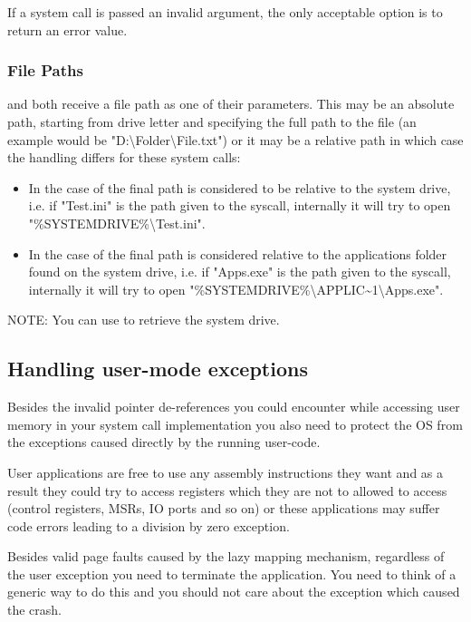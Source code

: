 If a system call is passed an invalid argument, the only acceptable option is to return an error
value.

\subsubsection{File Paths}

 and  both receive a file path as one of their
parameters. This may be an absolute path, starting from drive letter and specifying the full path
to the file (an example would be "D:\textbackslash Folder\textbackslash File.txt") or it may be a
relative path in which case the handling differs for these system calls:
\begin{itemize}
	\item In the case of  the final path is considered to be relative to the
system drive, i.e. if "Test.ini" is the path given to the syscall, internally it will try to open
"\%SYSTEMDRIVE\%\textbackslash Test.ini".

	\item In the case of  the final path is considered relative to the
applications folder found on the system drive, i.e. if "Apps.exe" is the path given to the syscall,
internally it will try to open "\%SYSTEMDRIVE\%\textbackslash APPLIC\textasciitilde 1\textbackslash Apps.exe".
\end{itemize}

NOTE: You can use  to retrieve the system drive.

\subsection{Handling user-mode exceptions}
\label{sect:UserExceptions}

Besides the invalid pointer de-references you could encounter while accessing user memory in your
system call implementation you also need to protect the OS from the exceptions caused directly by
the running user-code.

User applications are free to use any assembly instructions they want and as a result they could try
to access registers which they are not to allowed to access (control registers, MSRs, IO ports and
so on) or these applications may suffer code errors leading to a division by zero exception.

Besides valid page faults caused by the lazy mapping mechanism, regardless of the user exception you
need to terminate the application. You need to think of a generic way to do this and you should not
care about the exception which caused the crash.

